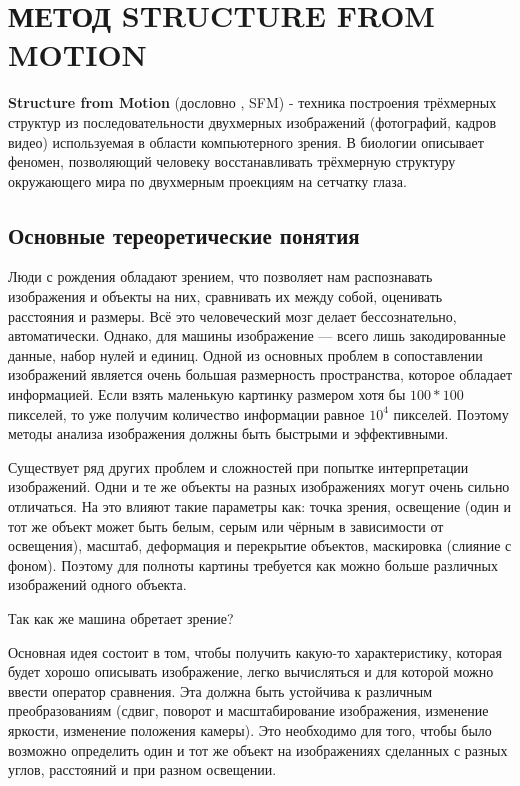 \chapter{МЕТОД STRUCTURE FROM MOTION}

\textbf{Structure from Motion} (дословно , SFM) - техника построения трёхмерных структур из последовательности двухмерных изображений (фотографий, кадров видео) используемая в области компьютерного зрения. В биологии описывает феномен, позволяющий человеку восстанавливать трёхмерную структуру окружающего мира по двухмерным проекциям на сетчатку глаза.

\section{Основные тереоретические понятия}

Люди с рождения обладают зрением, что позволяет нам распознавать изображения и объекты на них, сравнивать их между собой, оценивать расстояния и размеры. Всё это человеческий мозг делает бессознательно, автоматически. Однако, для машины изображение — всего лишь закодированные данные, набор нулей и единиц. Одной из основных проблем в сопоставлении изображений является очень большая размерность пространства, которое обладает информацией. Если взять маленькую картинку размером хотя бы $100*100$ пикселей, то уже получим количество информации равное $10^4$ пикселей. Поэтому методы анализа изображения должны быть быстрыми и эффективными.

Существует ряд других проблем и сложностей при попытке интерпретации изображений. Одни и те же объекты на разных изображениях могут очень сильно отличаться. На это влияют такие параметры как: точка зрения, освещение (один и тот же объект может быть белым, серым или чёрным в зависимости от освещения), масштаб, деформация и перекрытие объектов, маскировка (слияние с фоном). Поэтому для полноты картины требуется как можно больше различных изображений одного объекта.

\vspace{1em}
Так как же машина обретает зрение?

Основная идея состоит в том, чтобы получить какую-то характеристику, которая будет хорошо описывать изображение, легко вычисляться и для которой можно ввести оператор сравнения. Эта  должна быть устойчива к различным преобразованиям (сдвиг, поворот и масштабирование изображения, изменение яркости, изменение положения камеры). Это необходимо для того, чтобы было возможно определить один и тот же объект на изображениях сделанных с разных углов, расстояний и при разном освещении.

